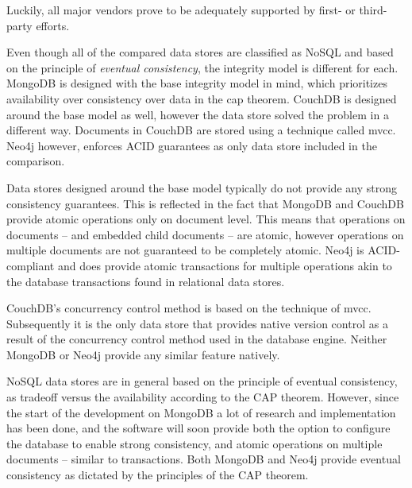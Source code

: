 Luckily, all major vendors prove to be adequately supported by first- or third-party efforts.

\begin{landscape}
  
\end{landscape}

Even though all of the compared data stores are classified as NoSQL and based on the principle of \textit{eventual consistency}, the integrity model is different for each.
MongoDB is designed with the \gls{base} integrity model in mind, which prioritizes availability over consistency over data in the \gls{cap} theorem.
CouchDB is designed around the \gls{base} model as well, however the data store solved the problem in a different way.
Documents in CouchDB are stored using a technique called \gls{mvcc}.
Neo4j however, enforces ACID guarantees as only data store included in the comparison.

Data stores designed around the \gls{base} model typically do not provide any strong consistency guarantees.
This is reflected in the fact that MongoDB and CouchDB provide atomic operations only on document level.
This means that operations on documents -- and embedded child documents -- are atomic, however operations on multiple documents are not guaranteed to be completely atomic.
Neo4j is ACID-compliant and does provide atomic transactions for multiple operations akin to the database transactions found in relational data stores.

CouchDB's concurrency control method is based on the technique of \gls{mvcc}.
Subsequently it is the only data store that provides native version control as a result of the concurrency control method used in the database engine.
Neither MongoDB or Neo4j provide any similar feature natively.

NoSQL data stores are in general based on the principle of eventual consistency, as tradeoff versus the availability according to the CAP theorem.
However, since the start of the development on MongoDB a lot of research and implementation has been done, and the software will soon provide both the option to configure the database to enable strong consistency, and atomic operations on multiple documents -- similar to transactions.
Both MongoDB and Neo4j provide eventual consistency as dictated by the principles of the CAP theorem.

\begin{landscape}
  
\end{landscape}

